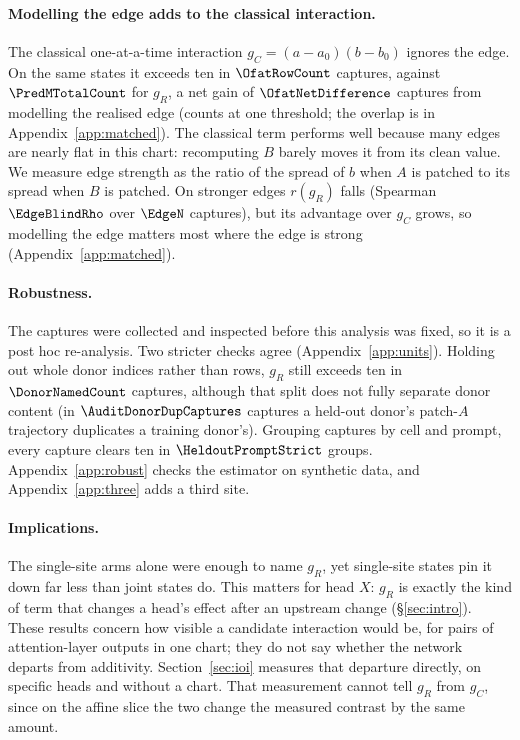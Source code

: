 \documentclass{article}
\theoremstyle{plain}
\theoremstyle{definition}
\begin{document}
\paragraph{Modelling the edge adds to the classical interaction.} The classical one-at-a-time interaction
$g_C=(a-a_0)(b-b_0)$ ignores the edge. On the same states it exceeds ten in $\OfatRowCount$ captures, against
$\PredMTotalCount$ for $g_R$, a net gain of $\OfatNetDifference$ captures from modelling the realised edge (counts at
one threshold; the overlap is in Appendix~\ref{app:matched}). The classical term performs well because many edges are
nearly flat in this chart: recomputing $B$ barely moves it from its clean value. We measure edge strength as the ratio
of the spread of $b$ when $A$ is patched to its spread when $B$ is patched. On stronger edges $r(g_R)$ falls (Spearman
$\EdgeBlindRho$ over $\EdgeN$ captures), but its advantage over $g_C$ grows, so modelling the edge matters most where
the edge is strong (Appendix~\ref{app:matched}).

\paragraph{Robustness.} The captures were collected and inspected before this analysis was fixed, so it is a post hoc
re-analysis. Two stricter checks agree (Appendix~\ref{app:units}). Holding out whole donor indices rather than rows,
$g_R$ still exceeds ten in $\DonorNamedCount$ captures, although that split does not fully separate donor content (in
$\AuditDonorDupCaptures$ captures a held-out donor's patch-$A$ trajectory duplicates a training donor's). Grouping
captures by cell and prompt, every capture clears ten in $\HeldoutPromptStrict$ groups. Appendix~\ref{app:robust}
checks the estimator on synthetic data, and Appendix~\ref{app:three} adds a third site.

\paragraph{Implications.} The single-site arms alone were enough to name $g_R$, yet single-site states pin it down far
less than joint states do. This matters for head $X$: $g_R$ is exactly the kind of term that changes a head's effect
after an upstream change (\S\ref{sec:intro}). These results concern how visible a candidate interaction would be, for
pairs of attention-layer outputs in one chart; they do not say whether the network departs from additivity.
Section~\ref{sec:ioi} measures that departure directly, on specific heads and without a chart. That measurement cannot
tell $g_R$ from $g_C$, since on the affine slice the two change the measured contrast by the same amount.
\end{document}
